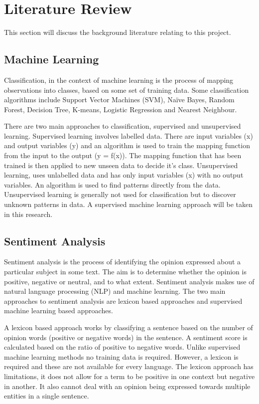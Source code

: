 \chapter{Literature Review}

This section will discuss the background literature relating to this project.

\section{Machine Learning}

\begin{justify}
Classification, in the context of machine learning is the process of mapping observations into classes, based on some set of training data. Some classification algorithms include Support Vector Machines (SVM), Naïve Bayes, Random Forest, Decision Tree, K-means, Logistic Regression and Nearest Neighbour.

There are two main approaches to classification, supervised and unsupervised learning. Supervised learning involves labelled data. There are input variables (x) and output variables (y) and an algorithm is used to train the mapping function from the input to the output (y = f(x)). The mapping function that has been trained is then applied to new unseen data to decide it's class. Unsupervised learning, uses unlabelled data and has only input variables (x) with no output variables. An algorithm is used to find patterns directly from the data. Unsupervised learning is generally not used for classification but to discover unknown patterns in data. A supervised machine learning approach will be taken in this research.
\end{justify}

\section{Sentiment Analysis}

Sentiment analysis is the process of identifying the opinion expressed about a particular subject in some text. The aim is to determine whether the opinion is positive, negative or neutral, and to what extent. Sentiment analysis makes use of natural language processing (NLP) and machine learning. The two main approaches to sentiment analysis are lexicon based approaches and supervised machine learning based approaches. 

A lexicon based approach works by classifying a sentence based on the number of opinion words (positive or negative words) in the sentence. A sentiment score is calculated based on the ratio of positive to negative words. Unlike supervised machine learning methods no training data is required. However, a lexicon is required and these are not available for every language. The lexicon approach has limitations, it does not allow for a term to be positive in one context but negative in another. It also cannot deal with an opinion being expressed towards multiple entities in a single sentence.

